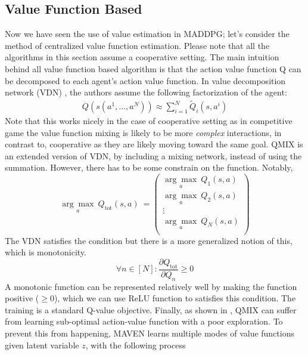 \subsection{Value Function Based}
Now we have seen the use of value estimation in MADDPG; let's consider the method of centralized value function estimation. Please note that all the algorithms in this section assume a cooperative setting. The main intuition behind all value function based algorithm is that the action value function Q can be decomposed to each agent's action value function. In value decomposition network (VDN) \cite{sunehag2017value}, the authors assume the following factorization of the agent:
\begin{equation}
\begin{aligned}
Q(s (a^1, \dots, a^N)) \approx \sum^N_{i=1} \tilde{Q}_i(s, a^i)
\end{aligned} 
\end{equation}
Note that this works nicely in the case of cooperative setting as in competitive game the value function mixing is likely to be more \textit{complex} interactions, in contrast to, cooperative as they are likely moving toward the same goal. QMIX \cite{rashid2018qmix} is an extended version of VDN, by including a mixing network, instead of using the summation. However, there has to be some constrain on the function. Notably, 
\begin{equation}
\underset{a}{\arg\max} \ Q_{\text{tot}}(s, a) \ = \begin{pmatrix}
	\underset{a}{\arg\max} \ Q_1(s, a) \\ \underset{a}{\arg\max} \ Q_2(s, a) \\ \vdots \\ \underset{a}{\arg\max} \ Q_N(s, a) \\
\end{pmatrix}
\end{equation}
The VDN satisfies the condition but there is a more generalized notion of this, which is monotonicity.
\begin{equation}
\forall n \in [N] : \frac{\partial Q_{\text{tot}}}{\partial Q_{n}} \ge 0
\end{equation}
A monotonic function can be represented relatively well \cite{dugas2009incorporating} by making the function positive ($\ge 0$), which we can use ReLU function \cite{nair2010rectified} to satisfies this condition. The training is a standard Q-value objective. Finally, as shown in \cite{mahajan2019maven}, QMIX can suffer from learning sub-optimal action-value function with a poor exploration. To prevent this from happening, MAVEN \cite{mahajan2019maven} learns multiple modes of value functions given latent variable $z$, with the following process
